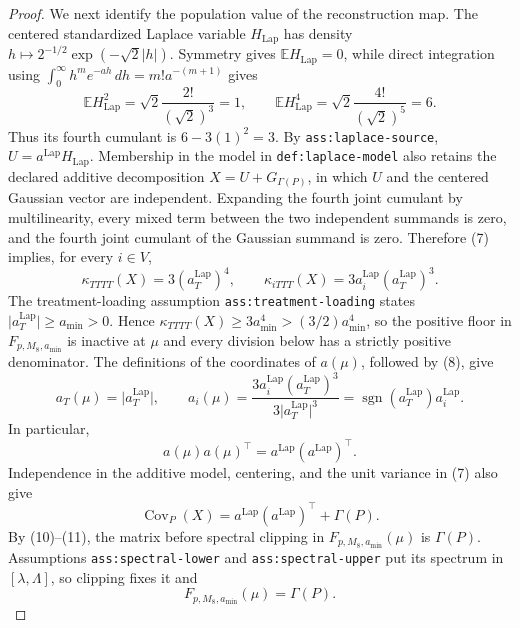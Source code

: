 \documentclass{article}
\begin{document}
\begin{proof}
We next identify the population value of the reconstruction map.  The
centered standardized Laplace variable \(H_{\mathrm{Lap}}\) has density
\(h\mapsto 2^{-1/2}\exp(-\sqrt2\lvert h\rvert)\).  Symmetry gives
\(\mathbb EH_{\mathrm{Lap}}=0\), while direct integration using
\(\int_0^\infty h^m e^{-ah}\,dh=m!a^{-(m+1)}\) gives
\[
 \mathbb EH_{\mathrm{Lap}}^2
 =\sqrt2\frac{2!}{(\sqrt2)^3}=1,
 \qquad
 \mathbb EH_{\mathrm{Lap}}^4
 =\sqrt2\frac{4!}{(\sqrt2)^5}=6.                       \tag{7}
\]
Thus its fourth cumulant is \(6-3(1)^2=3\).
By \texttt{ass:laplace-source},
\(U=a^{\mathrm{Lap}}H_{\mathrm{Lap}}\).  Membership in the model in
\texttt{def:laplace-model} also retains the declared additive decomposition
\(X=U+G_{\Gamma(P)}\), in which \(U\) and the centered Gaussian vector are
independent.  Expanding the fourth joint cumulant by multilinearity, every
mixed term between the two independent summands is zero, and the fourth
joint cumulant of the Gaussian summand is zero.  Therefore (7) implies, for
every \(i\in V\),
\[
 \kappa_{TTTT}(X)=3(a_T^{\mathrm{Lap}})^4,
 \qquad
 \kappa_{iTTT}(X)=3a_i^{\mathrm{Lap}}(a_T^{\mathrm{Lap}})^3. \tag{8}
\]
The treatment-loading assumption \texttt{ass:treatment-loading} states
\(\lvert a_T^{\mathrm{Lap}}\rvert\geq a_{\min}>0\).  Hence
\(\kappa_{TTTT}(X)\geq3a_{\min}^4>(3/2)a_{\min}^4\), so the positive
floor in \(F_{p,M_8,a_{\min}}\) is inactive at \(\mu\) and every division
below has a strictly positive denominator.  The definitions of the
coordinates of \(a(\mu)\), followed by (8), give
\[
 a_T(\mu)=\lvert a_T^{\mathrm{Lap}}\rvert,
 \qquad
 a_i(\mu)
 =\frac{3a_i^{\mathrm{Lap}}(a_T^{\mathrm{Lap}})^3}
 {3\lvert a_T^{\mathrm{Lap}}\rvert^3}
 =\operatorname{sgn}(a_T^{\mathrm{Lap}})a_i^{\mathrm{Lap}}. \tag{9}
\]
In particular,
\[
 a(\mu)a(\mu)^\top
 =a^{\mathrm{Lap}}(a^{\mathrm{Lap}})^\top.              \tag{10}
\]
Independence in the additive model, centering, and the unit variance in (7)
also give
\[
 \operatorname{Cov}_P(X)
 =a^{\mathrm{Lap}}(a^{\mathrm{Lap}})^\top+\Gamma(P).    \tag{11}
\]
By (10)--(11), the matrix before spectral clipping in
\(F_{p,M_8,a_{\min}}(\mu)\) is \(\Gamma(P)\).  Assumptions
\texttt{ass:spectral-lower} and \texttt{ass:spectral-upper} put its spectrum
in \([\lambda,\Lambda]\), so clipping fixes it and
\[
 F_{p,M_8,a_{\min}}(\mu)=\Gamma(P).                     \tag{12}
\]


\end{proof}
\end{document}

